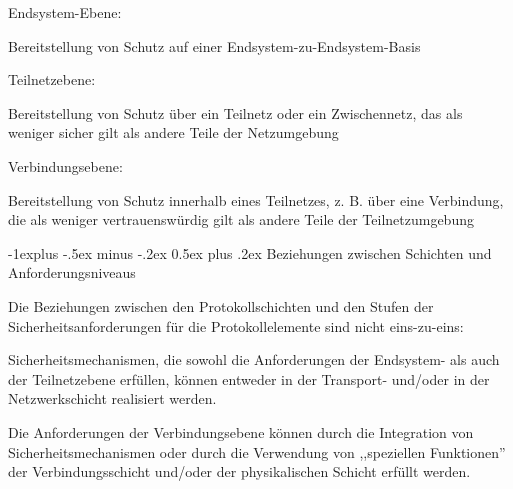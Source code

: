 \documentclass[a4paper]{article}
\makeatletter
\renewcommand{\subsection}{\@startsection{subsection}{2}{0mm}%
 {-1explus -.5ex minus -.2ex}%
 {0.5ex plus .2ex}%
 {\normalfont\normalsize\bfseries}}
\makeatother
\begin{document}
\begin{multicols}{3}
\begin{itemize*}
\begin{itemize*}
                  \item Endsystem-Ebene:
                  \begin{itemize*} \item Bereitstellung von Schutz auf einer Endsystem-zu-Endsystem-Basis \end{itemize*}
                  \item Teilnetzebene:
                  \begin{itemize*} \item Bereitstellung von Schutz über ein Teilnetz oder ein Zwischennetz, das als weniger sicher gilt als andere Teile der Netzumgebung \end{itemize*}
                  \item Verbindungsebene:
                  \begin{itemize*} \item Bereitstellung von Schutz innerhalb eines Teilnetzes, z. B. über eine Verbindung, die als weniger vertrauenswürdig gilt als andere Teile der Teilnetzumgebung \end{itemize*}
            \end{itemize*}
      \end{itemize*}


      \subsection{Beziehungen zwischen Schichten und
            Anforderungsniveaus}

      \begin{itemize*}
            \item Die Beziehungen zwischen den Protokollschichten und den Stufen der
            Sicherheitsanforderungen für die Protokollelemente sind nicht
            eins-zu-eins:
            \begin{itemize*}
                  \item Sicherheitsmechanismen, die sowohl die Anforderungen der Endsystem- als auch der Teilnetzebene erfüllen, können entweder in der Transport- und/oder in der Netzwerkschicht realisiert werden.
                  \item Die Anforderungen der Verbindungsebene können durch die Integration von Sicherheitsmechanismen oder durch die Verwendung von ,,speziellen Funktionen'' der Verbindungsschicht und/oder der physikalischen Schicht erfüllt werden.
            \end{itemize*}
      \end{itemize*}



\end{multicols}
\end{document}
